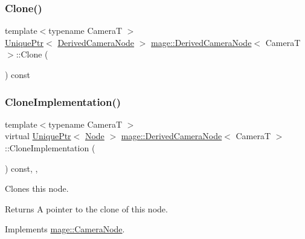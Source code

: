 \subsubsection{\texorpdfstring{Clone()}{Clone()}}
{\footnotesize\ttfamily template$<$typename CameraT $>$ \\
\hyperlink{namespacemage_a8c307fbcc33bce9b7f2aa4c26c3b95cf}{Unique\+Ptr}$<$ \hyperlink{classmage_1_1_derived_camera_node}{Derived\+Camera\+Node} $>$ \hyperlink{classmage_1_1_derived_camera_node}{mage\+::\+Derived\+Camera\+Node}$<$ CameraT $>$\+::Clone (\begin{DoxyParamCaption}{ }\end{DoxyParamCaption}) const}

\hypertarget{classmage_1_1_derived_camera_node_aa965751029ebd6b41d3805b499a8304e}{}\label{classmage_1_1_derived_camera_node_aa965751029ebd6b41d3805b499a8304e} 
\subsubsection{\texorpdfstring{Clone\+Implementation()}{CloneImplementation()}}
{\footnotesize\ttfamily template$<$typename CameraT $>$ \\
virtual \hyperlink{namespacemage_a8c307fbcc33bce9b7f2aa4c26c3b95cf}{Unique\+Ptr}$<$ \hyperlink{classmage_1_1_node}{Node} $>$ \hyperlink{classmage_1_1_derived_camera_node}{mage\+::\+Derived\+Camera\+Node}$<$ CameraT $>$\+::Clone\+Implementation (\begin{DoxyParamCaption}{ }\end{DoxyParamCaption}) const\hspace{0.3cm}{\ttfamily [override]}, {\ttfamily [private]}, {\ttfamily [virtual]}}

Clones this node.

\begin{DoxyReturn}{Returns}
A pointer to the clone of this node. 
\end{DoxyReturn}


Implements \hyperlink{classmage_1_1_camera_node_a002d3a2b41cda270a26ca5d8f3a17f55}{mage\+::\+Camera\+Node}.

\hypertarget{classmage_1_1_derived_camera_node_a1deeed527532c35d763c415b7c6eb6b1}{}\label{classmage_1_1_derived_camera_node_a1deeed527532c35d763c415b7c6eb6b1} 
